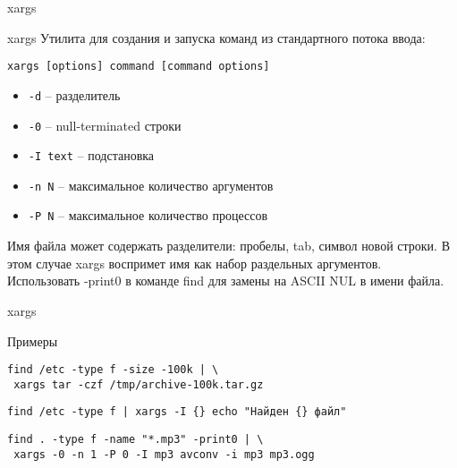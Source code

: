 \begin{frame}[fragile]{xargs}
	\begin{block}{xargs}
			Утилита для создания и запуска команд из стандартного потока ввода:
		\begin{verbatim}
xargs [options] command [command options]
		\end{verbatim}

		\begin{itemize}
			\item {\tt -d} -- разделитель
			\item {\tt -0} -- null-terminated строки
			\item {\tt -I text} -- подстановка
			\item {\tt -n N} -- максимальное количество аргументов
			\item {\tt -P N} -- максимальное количество процессов
		\end{itemize}

	\end{block}
Имя файла может содержать разделители: пробелы, tab, символ новой строки. В этом случае xargs воспримет имя как набор раздельных аргументов. Использовать -print0 в команде find для замены на ASCII NUL в имени файла.
\end{frame}

\begin{frame}[fragile]{xargs}
	\begin{block}{Примеры}
		\begin{verbatim}
find /etc -type f -size -100k | \
 xargs tar -czf /tmp/archive-100k.tar.gz
		\end{verbatim}

		\begin{verbatim}
find /etc -type f | xargs -I {} echo "Найден {} файл"
		\end{verbatim}

		\begin{verbatim}
find . -type f -name "*.mp3" -print0 | \
 xargs -0 -n 1 -P 0 -I mp3 avconv -i mp3 mp3.ogg
		\end{verbatim}
	
	\end{block}
\end{frame}

